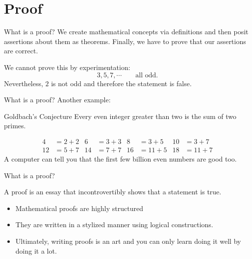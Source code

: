 \documentclass{beamer}
\begin{document}
\section{Proof}

\begin{frame}{What is a proof?}
We create mathematical concepts via definitions and then posit assertions about them as theorems. Finally, we have to prove that our assertions are correct.\pause
\begin{block}{}
\end{block}
\pause
We cannot prove this by experimentation:
\[
3,5,7,\cdots \qquad\textrm{all odd.}
\]\pause
Nevertheless, $2$ is not odd and therefore the statement is false.
\end{frame}

\begin{frame}{What is a proof?}
Another example:
\begin{block}{Goldbach's Conjecture}
Every even integer greater than two is the sum of two primes.
\end{block}\pause
\begin{align*}
4&=2+2 &6&=3+3 &8&=3+5&10&=3+7\\
12&=5+7  &14&=7+7&16&=11+5&18&=11+7
\end{align*}
A computer can tell you that the first few billion even numbers are good too.\pause
{}
\end{frame}

\begin{frame}{What is a proof?}
\begin{block}{}
A proof is an essay that incontrovertibly shows that a statement is true.
\end{block}\pause
\begin{itemize}
\item Mathematical proofs are highly structured \pause
\item They are written in a stylized manner using logical constructions.\pause
\item Ultimately, writing proofs is an art and you can only learn doing it well by doing it a lot.
\end{itemize}

\end{frame}
\end{document}
